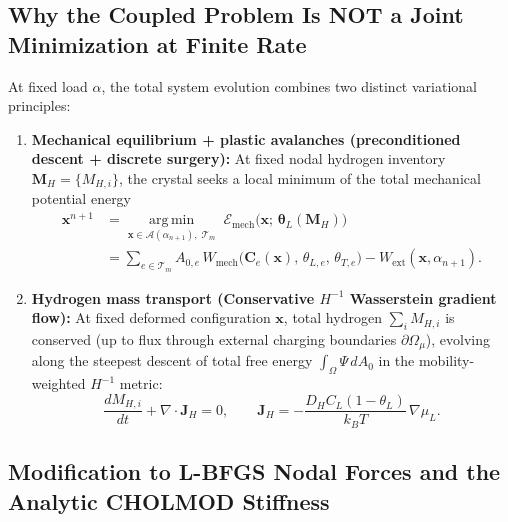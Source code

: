 \documentclass[11pt,a4paper]{article}
\begin{document}
\subsection{Why the Coupled Problem Is NOT a Joint Minimization at Finite Rate}

At fixed load $\alpha$, the total system evolution combines two distinct variational principles:
\begin{enumerate}[nosep]
  \item \textbf{Mechanical equilibrium + plastic avalanches (preconditioned descent + discrete surgery):}
  At fixed nodal hydrogen inventory $\mathbf{M}_H = \{M_{H,i}\}$, the crystal seeks a local minimum of the total mechanical potential energy
  \begin{equation}
    \begin{aligned}
    \mathbf{x}^{n+1} &= \operatorname*{arg\,min}_{\mathbf{x} \in \mathcal{A}(\alpha_{n+1}),\; \mathcal{T}_m}
    \;\mathcal{E}_{\text{mech}}\bigl(\mathbf{x};\, \boldsymbol{\theta}_L(\mathbf{M}_H)\bigr) \\
    &= \sum_{e \in \mathcal{T}_m} A_{0,e}\, W_{\text{mech}}\bigl(\mathbf{C}_e(\mathbf{x}),\, \theta_{L,e},\, \theta_{T,e}\bigr) - W_{\text{ext}}(\mathbf{x}, \alpha_{n+1}).
    \end{aligned}
    \label{eq:mech_min}
  \end{equation}
  \item \textbf{Hydrogen mass transport (Conservative $H^{-1}$ Wasserstein gradient flow):}
  At fixed deformed configuration $\mathbf{x}$, total hydrogen $\sum_i M_{H,i}$ is conserved (up to flux through external charging boundaries $\partial\Omega_\mu$), evolving along the steepest descent of total free energy $\int_\Omega \Psi\, dA_0$ in the mobility-weighted $H^{-1}$ metric:
  \begin{equation}
    \frac{d M_{H,i}}{dt} + \nabla \cdot \mathbf{J}_H = 0, \qquad
    \mathbf{J}_H = -\frac{D_H C_L(1 - \theta_L)}{k_B T}\,\nabla \mu_L.
    \label{eq:h_conservation}
  \end{equation}
\end{enumerate}

\subsection{Modification to L-BFGS Nodal Forces and the Analytic CHOLMOD Stiffness}
\end{document}
